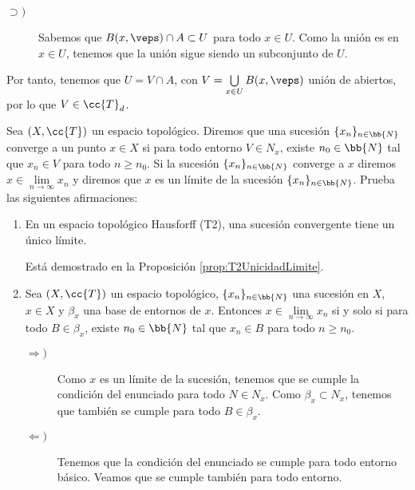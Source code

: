 \begin{ejercicio}
\begin{enumerate}
\begin{description}
\begin{description}
                \item[$\supset)$] Sabemos que $B(x,\veps)\cap A\subset U$ para todo $x\in U$. Como la unión es en $x\in U$, tenemos que la unión sigue siendo un subconjunto de $U$.
            \end{description}

            Por tanto, tenemos que $U=V\cap A$, con $V=\bigcup\limits_{x\in U}B(x,\veps)$ unión de abiertos, por lo que $V\in \cc{T}_d$.
        \end{description}
    \end{enumerate}
\end{ejercicio}

\begin{ejercicio} \label{ej:Sucesiones}
    Sea $(X,\cc{T})$ un espacio topológico. Diremos que una sucesión $\{x_n\}_{n\in \bb{N}}$ converge a un punto $x\in X$ si para todo entorno $V\in {N}_x$, existe $n_0\in \bb{N}$ tal que $x_n\in V$ para todo $n\geq n_0$. Si la sucesión $\{x_n\}_{n\in \bb{N}}$ converge a $x$ diremos $x\in \lim\limits_{n\to \infty} x_n$ y diremos que $x$ es un límite de la sucesión $\{x_n\}_{n\in \bb{N}}$. Prueba las siguientes afirmaciones:
    \begin{enumerate}[label=\alph*)]
        \item En un espacio topológico Hausforff (T2), una sucesión convergente tiene un único límite.

        Está demostrado en la Proposición \ref{prop:T2UnicidadLimite}.

        \item Sea $(X, \cc{T})$ un espacio topológico, $\{x_n\}_{n\in \bb{N}}$ una sucesión en $X$, $x\in X$ y $\beta_x$ una base de entornos de $x$. Entonces $x\in \lim\limits_{n\to \infty}x_n$ si y solo si para todo $B\in \beta_x$, existe $n_0\in \bb{N}$ tal que $x_n\in B$ para todo $n\geq n_0$.

        \begin{description}
            \item[$\Longrightarrow)$]
                Como $x$ es un límite de la sucesión, tenemos que se cumple la condición del enunciado para todo $N\in N_x$. Como $\beta_x\subset N_x$, tenemos que también se cumple para todo $B\in \beta_x$.
                
            \item[$\Longleftarrow)$]
                Tenemos que la condición del enunciado se cumple para todo entorno básico. Veamos que se cumple también para todo entorno.


\end{description}
\end{enumerate}
\end{ejercicio}
